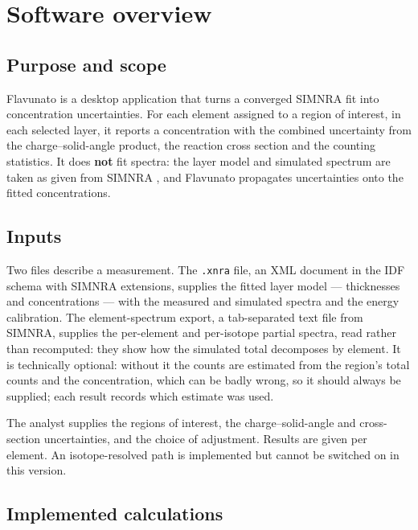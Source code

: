 \section{Software overview}\label{software-overview}

\subsection{Purpose and scope}\label{purpose-and-scope}

Flavunato is a desktop application that turns a converged SIMNRA fit
into concentration uncertainties. For each element assigned to a region
of interest, in each selected layer, it reports a concentration with the
combined uncertainty from the charge--solid-angle product, the reaction
cross section and the counting statistics. It does \textbf{not} fit
spectra: the layer model and simulated spectrum are taken as given from
SIMNRA \citep{mayer1999simnra}, and Flavunato propagates uncertainties
onto the fitted concentrations.

\subsection{Inputs}\label{inputs}

Two files describe a measurement. The \texttt{.xnra} file, an XML
document in the IDF schema with SIMNRA extensions, supplies the fitted
layer model --- thicknesses and concentrations --- with the measured and
simulated spectra and the energy calibration. The element-spectrum
export, a tab-separated text file from SIMNRA, supplies the per-element
and per-isotope partial spectra, read rather than recomputed: they show
how the simulated total decomposes by element. It is technically
optional: without it the counts are estimated from the region's total
counts and the concentration, which can be badly wrong, so it should
always be supplied; each result records which estimate was used.

The analyst supplies the regions of interest, the charge--solid-angle
and cross-section uncertainties, and the choice of adjustment. Results
are given per element. An isotope-resolved path is implemented but
cannot be switched on in this version.

\subsection{Implemented calculations}\label{implemented-calculations}

